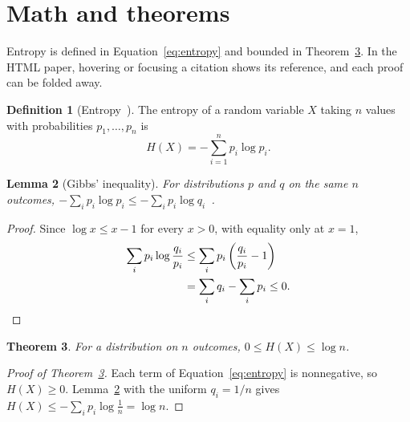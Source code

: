 \documentclass{article}
\newtheorem{theorem}{Theorem}
\newtheorem{lemma}[theorem]{Lemma}
\theoremstyle{definition}
\newtheorem{definition}[theorem]{Definition}
\begin{document}
\section{Math and theorems}
Entropy is defined in Equation~\eqref{eq:entropy} and bounded in
Theorem~\ref{thm:bound}. In the HTML paper, hovering or focusing a
citation shows its reference, and each proof can be folded away.
\begin{definition}[Entropy~\cite{shannon1948mathematical}]\label{def:entropy}
The entropy of a random variable $X$ taking $n$ values with probabilities
$p_1, \dots, p_n$ is
\begin{equation}\label{eq:entropy}
H(X) = -\sum_{i=1}^{n} p_i \log p_i .
\end{equation}
\end{definition}
\begin{lemma}[Gibbs' inequality]\label{lem:gibbs}
For distributions $p$ and $q$ on the same $n$ outcomes,
$-\sum_i p_i \log p_i \le -\sum_i p_i \log q_i$~\cite[Thm.~2.6.3]{cover2006elements}.
\end{lemma}
\begin{proof}
Since $\log x \le x - 1$ for every $x > 0$, with equality only at $x = 1$,
\begin{align*}
\sum_i p_i \log \frac{q_i}{p_i}
  &\le \sum_i p_i \left( \frac{q_i}{p_i} - 1 \right) \\
  &= \sum_i q_i - \sum_i p_i \le 0 . \qedhere
\end{align*}
\end{proof}
\begin{theorem}\label{thm:bound}
For a distribution on $n$ outcomes, $0 \le H(X) \le \log n$.
\end{theorem}
\begin{proof}[Proof of Theorem~\ref{thm:bound}]
Each term of Equation~\eqref{eq:entropy} is nonnegative, so $H(X) \ge 0$.
Lemma~\ref{lem:gibbs} with the uniform $q_i = 1/n$ gives
$H(X) \le -\sum_i p_i \log \tfrac{1}{n} = \log n$.
\end{proof}
\end{document}
